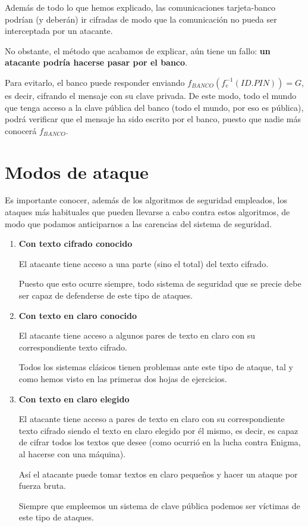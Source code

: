 Además de todo lo que hemos explicado, las comunicaciones tarjeta-banco podrían (y deberán) ir cifradas de modo que la comunicación no pueda ser interceptada por un atacante.

No obstante, el método que acabamos de explicar, aún tiene un fallo: \textbf{un atacante podría hacerse pasar por el banco}. 

Para evitarlo, el banco puede responder enviando $f_{BANCO}(f_e^{-1}(ID.PIN))=G$, es decir, cifrando el mensaje con su clave privada. De este modo, todo el mundo que tenga acceso a la clave pública del banco (todo el mundo, por eso es pública), podrá verificar que el mensaje ha sido escrito por el banco, puesto que nadie más conocerá $f_{BANCO}$.

\section{Modos de ataque}

Es importante conocer, además de los algoritmos de seguridad empleados, los ataques más habituales que pueden llevarse a cabo contra estos algoritmos, de modo que podamos anticiparnos a las carencias del sistema de seguridad.

\begin{enumerate}
\item \textbf{Con texto cifrado conocido}

El atacante tiene acceso a una parte (sino el total) del texto cifrado.

Puesto que esto ocurre siempre, todo sistema de seguridad que se precie debe ser capaz de defenderse de este tipo de ataques.

\item \textbf{Con texto en claro conocido}

El atacante tiene acceso a algunos pares de texto en claro con su correspondiente texto cifrado.

Todos los sistemas clásicos tienen problemas ante este tipo de ataque, tal y como hemos visto en las primeras dos hojas de ejercicios.

\item \textbf{Con texto en claro elegido}

El atacante tiene acceso a pares de texto en claro con su correspondiente texto cifrado siendo el texto en claro elegido por él mismo, es decir, es capaz de cifrar todos los textos que desee (como ocurrió en la lucha contra Enigma, al hacerse con una máquina).

Así el atacante puede tomar textos en claro pequeños y hacer un ataque por fuerza bruta.

Siempre que empleemos un sistema de clave pública podemos ser víctimas de este tipo de ataques. 
\end{enumerate}

